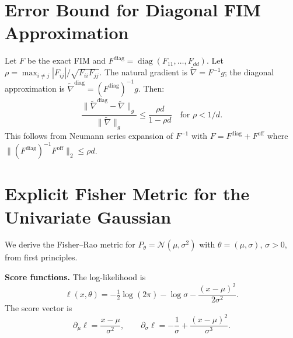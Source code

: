 \documentclass[a4paper,fleqn]{cas-dc}
\DeclareMathOperator{\diag}{diag}
\newcommand{\natgrad}{\widetilde{\nabla}}
\begin{document}
\section{Error Bound for Diagonal FIM Approximation}
\label{app:diag_error}

Let $F$ be the exact FIM and $F^{\mathrm{diag}} = \diag(F_{11},\ldots,F_{dd})$.
Let $\rho = \max_{i\neq j} |F_{ij}| / \sqrt{F_{ii}F_{jj}}$.
The natural gradient is $\natgrad = F^{-1}g$; the diagonal approximation
is $\natgrad^{\mathrm{diag}} = (F^{\mathrm{diag}})^{-1}g$.
Then:
\[
  \frac{\|\natgrad^{\mathrm{diag}} - \natgrad\|_g}{\|\natgrad\|_g}
  \leq \frac{\rho d}{1 - \rho d} \quad \text{for } \rho < 1/d.
\]
This follows from Neumann series expansion of $F^{-1}$ with
$F = F^{\mathrm{diag}} + F^{\mathrm{off}}$ where
$\| (F^{\mathrm{diag}})^{-1} F^{\mathrm{off}} \|_2 \leq \rho d$.

\section{Explicit Fisher Metric for the Univariate Gaussian}
\label{app:gaussian_fisher}

We derive the Fisher--Rao metric for
$P_\theta = \mathcal{N}(\mu,\sigma^2)$ with
$\theta=(\mu,\sigma)$, $\sigma>0$, from first principles.

\textbf{Score functions.}
The log-likelihood is
\[
  \ell(x,\theta) = -\tfrac12\log(2\pi) - \log\sigma
  - \frac{(x-\mu)^2}{2\sigma^2}.
\]
The score vector is
\[
  \partial_\mu \ell = \frac{x-\mu}{\sigma^2}, \qquad
  \partial_\sigma \ell = -\frac{1}{\sigma} + \frac{(x-\mu)^2}{\sigma^3}.
\]
\end{document}
